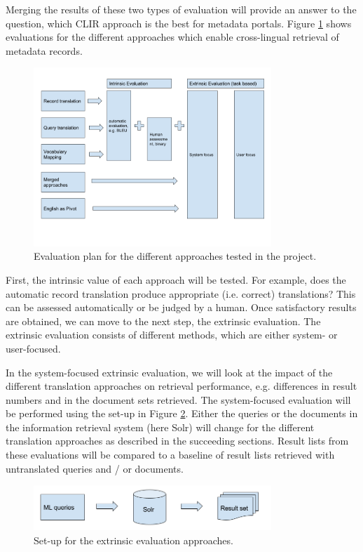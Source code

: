 \documentclass[a4paper,11pt]{article}
\begin{document}
Merging the results of these two types of evaluation will provide an answer to the question, which CLIR approach is the best for metadata portals. Figure \ref{fig1} shows evaluations for the different approaches which enable cross-lingual retrieval of metadata records.  
\begin{figure}[h]
	\centering
  \includegraphics[width=0.8\textwidth]{./img/overview_evaluation.png}
	\caption{Evaluation plan for the different approaches tested in the project.}
	\label{fig1}
\end{figure}

First, the intrinsic value of each approach will be tested. For example, does the automatic record translation produce appropriate (i.e. correct) translations? This can be assessed automatically or be judged by a human. Once satisfactory results are obtained, we can move to the next step, the extrinsic evaluation. The extrinsic evaluation consists of different methods, which are either system- or user-focused.

In the system-focused extrinsic evaluation, we will look at the impact of the different translation approaches on retrieval performance, e.g. differences in result numbers and in the document sets retrieved. The system-focused evaluation will be performed using the set-up in Figure \ref{fig2}. Either the queries or the documents in the information retrieval system (here Solr) will change for the different translation approaches as described in the succeeding sections. Result lists from these evaluations will be compared to a baseline of result lists retrieved with untranslated queries and / or documents.

\begin{figure}[h]
	\centering
  \includegraphics[width=0.8\textwidth]{./img/Info_sys.png}
	\caption{Set-up for the extrinsic evaluation approaches.}
	\label{fig2}
\end{figure}
\end{document}
